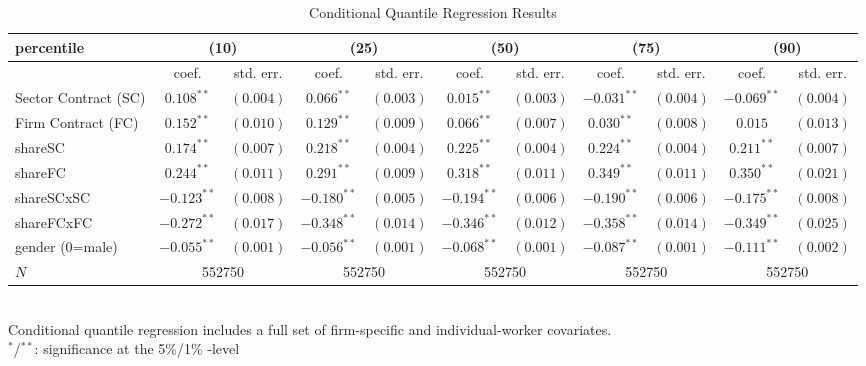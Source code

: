 \begin{landscape}
\begin{table}[]
\scriptsize
\centering
\caption{Conditional Quantile Regression Results}
\label{CQR}
\begin{tabular}{l|cccccccccc}
 percentile & \multicolumn{2}{c}{(10)} & \multicolumn{2}{c}{(25)} & \multicolumn{2}{c}{(50)} & \multicolumn{2}{c}{(75)} & \multicolumn{2}{c}{(90)}\\
\hline
                & coef.             & std. err. & coef.     & std. err.         & coef.             & std. err. & coef.         & std. err. & coef.         & std. err. \\
\hline
Sector Contract (SC)    & $0.108^{**}$      & $(0.004)$ & $0.066^{**}$   & $(0.003)$    & $0.015^{**}$      & $(0.003)$ & $-0.031^{**}$ & $(0.004)$ & $-0.069^{**}$ & $(0.004)$\\
Firm Contract (FC)      & $0.152^{**}$      & $(0.010)$ & $0.129^{**}$   & $(0.009)$    & $0.066^{**}$      & $(0.007)$ & $0.030^{**}$  & $(0.008)$ & $0.015$       & $(0.013)$\\
shareSC                 & $0.174^{**}$      & $(0.007)$ & $0.218^{**}$   & $(0.004)$    & $0.225^{**}$      & $(0.004)$ & $0.224^{**}$  & $(0.004)$ & $0.211^{**}$  & $(0.007)$\\
shareFC                 & $0.244^{**}$      & $(0.011)$ & $0.291^{**}$   & $(0.009)$    & $0.318^{**}$      & $(0.011)$ & $0.349^{**}$  & $(0.011)$ & $0.350^{**}$  & $(0.021)$\\
shareSCxSC              & $-0.123^{**}$     & $(0.008)$ & $-0.180^{**}$  & $(0.005)$    & $-0.194^{**}$     & $(0.006)$ & $-0.190^{**}$ & $(0.006)$ & $-0.175^{**}$ & $(0.008)$\\
shareFCxFC              & $-0.272^{**}$     & $(0.017)$ & $-0.348^{**}$  & $(0.014)$    & $-0.346^{**}$     & $(0.012)$ & $-0.358^{**}$ & $(0.014)$ & $-0.349^{**}$ & $(0.025)$\\
gender (0=male)          & $-0.055^{**}$    & $(0.001)$ & $-0.056^{**}$  & $(0.001)$    & $-0.068^{**}$     & $(0.001)$ & $-0.087^{**}$ & $(0.001)$ & $-0.111^{**}$ & $(0.002)$\\
\hline
$N$                     & \multicolumn{2}{c}{552750} & \multicolumn{2}{c}{552750} & \multicolumn{2}{c}{552750} & \multicolumn{2}{c}{552750} & \multicolumn{2}{c}{552750} \\
\hline
\end{tabular}\\
\bigskip
Conditional quantile regression includes a full set of firm-specific and individual-worker covariates.\\
$^{*}$/$^{**}$: significance at the 5\%/1\% -level
\end{table}
\end{landscape}


